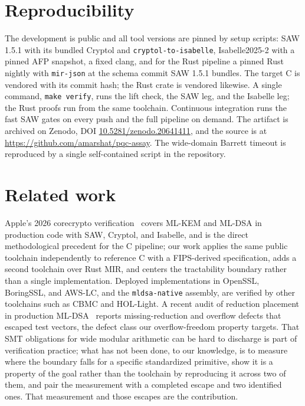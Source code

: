 \documentclass[11pt]{article}
\newcommand{\code}[1]{\texttt{#1}}
\begin{document}
\section{Reproducibility}\label{sec:repro}

The development is public and all tool versions are pinned by setup scripts: SAW 1.5.1 with its bundled
Cryptol and \code{cryptol-to-isabelle}, Isabelle2025-2 with a pinned AFP snapshot, a fixed clang, and for
the Rust pipeline a pinned Rust nightly with \code{mir-json} at the schema commit SAW 1.5.1 bundles. The
target C is vendored with its commit hash; the Rust crate is vendored likewise. A single command,
\code{make verify}, runs the lift check, the SAW leg, and the Isabelle leg; the Rust proofs run from the
same toolchain. Continuous integration runs the fast SAW gates on every push and the full pipeline on
demand. The artifact is archived on Zenodo, DOI
\href{https://doi.org/10.5281/zenodo.20641411}{10.5281/zenodo.20641411}, and the source is at
\url{https://github.com/amarshat/pqc-assay}. The wide-domain Barrett timeout is reproduced by a single
self-contained script in the repository.

\section{Related work}\label{sec:related}

Apple's 2026 corecrypto verification~\cite{corecrypto} covers ML-KEM and ML-DSA in production code with
SAW, Cryptol, and Isabelle, and is the direct methodological precedent for the C pipeline; our work
applies the same public toolchain independently to reference C with a FIPS-derived specification, adds a
second toolchain over Rust MIR, and centers the tractability boundary rather than a single
implementation. Deployed implementations in OpenSSL, BoringSSL, and AWS-LC, and the \code{mldsa-native}
assembly, are verified by other toolchains such as CBMC and HOL-Light. A recent audit of reduction
placement in production ML-DSA~\cite{eprint1032} reports missing-reduction and overflow defects that
escaped test vectors, the defect class our overflow-freedom property targets. That SMT
obligations for wide modular arithmetic can be hard to discharge is part of verification practice; what
has not been done, to our knowledge, is to measure where the boundary falls for a specific standardized
primitive, show it is a property of the goal rather than the toolchain by reproducing it across two of
them, and pair the measurement with a completed escape and two identified ones. That measurement and
those escapes are the contribution.
\end{document}
